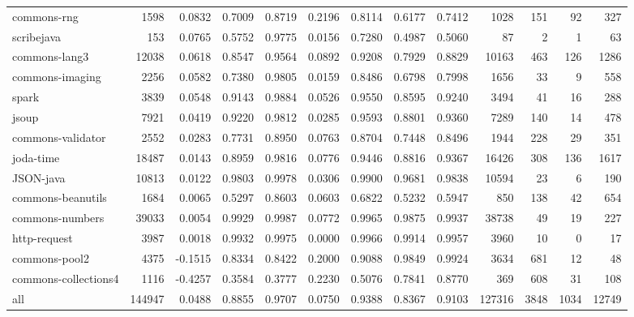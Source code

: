 \begin{table*}
\begin{tabular}{lrrrrrrrrrrrr}
            commons-rng &    1598 &      0.0832 &  0.7009 &     0.8719 &     0.2196 &  0.8114 &     0.6177 &   0.7412 &    1028 &   151 &    92 &    327 \\
             scribejava &     153 &      0.0765 &  0.5752 &     0.9775 &     0.0156 &  0.7280 &     0.4987 &   0.5060 &      87 &     2 &     1 &     63 \\
          commons-lang3 &   12038 &      0.0618 &  0.8547 &     0.9564 &     0.0892 &  0.9208 &     0.7929 &   0.8829 &   10163 &   463 &   126 &   1286 \\
        commons-imaging &    2256 &      0.0582 &  0.7380 &     0.9805 &     0.0159 &  0.8486 &     0.6798 &   0.7998 &    1656 &    33 &     9 &    558 \\
                  spark &    3839 &      0.0548 &  0.9143 &     0.9884 &     0.0526 &  0.9550 &     0.8595 &   0.9240 &    3494 &    41 &    16 &    288 \\
                  jsoup &    7921 &      0.0419 &  0.9220 &     0.9812 &     0.0285 &  0.9593 &     0.8801 &   0.9360 &    7289 &   140 &    14 &    478 \\
      commons-validator &    2552 &      0.0283 &  0.7731 &     0.8950 &     0.0763 &  0.8704 &     0.7448 &   0.8496 &    1944 &   228 &    29 &    351 \\
              joda-time &   18487 &      0.0143 &  0.8959 &     0.9816 &     0.0776 &  0.9446 &     0.8816 &   0.9367 &   16426 &   308 &   136 &   1617 \\
              JSON-java &   10813 &      0.0122 &  0.9803 &     0.9978 &     0.0306 &  0.9900 &     0.9681 &   0.9838 &   10594 &    23 &     6 &    190 \\
      commons-beanutils &    1684 &      0.0065 &  0.5297 &     0.8603 &     0.0603 &  0.6822 &     0.5232 &   0.5947 &     850 &   138 &    42 &    654 \\
        commons-numbers &   39033 &      0.0054 &  0.9929 &     0.9987 &     0.0772 &  0.9965 &     0.9875 &   0.9937 &   38738 &    49 &    19 &    227 \\
           http-request &    3987 &      0.0018 &  0.9932 &     0.9975 &     0.0000 &  0.9966 &     0.9914 &   0.9957 &    3960 &    10 &     0 &     17 \\
          commons-pool2 &    4375 &     -0.1515 &  0.8334 &     0.8422 &     0.2000 &  0.9088 &     0.9849 &   0.9924 &    3634 &   681 &    12 &     48 \\
   commons-collections4 &    1116 &     -0.4257 &  0.3584 &     0.3777 &     0.2230 &  0.5076 &     0.7841 &   0.8770 &     369 &   608 &    31 &    108 \\
                    all &  144947 &      0.0488 &  0.8855 &     0.9707 &     0.0750 &  0.9388 &     0.8367 &   0.9103 &  127316 &  3848 &  1034 &  12749 \\
\bottomrule
\end{tabular}
\end{table*}
